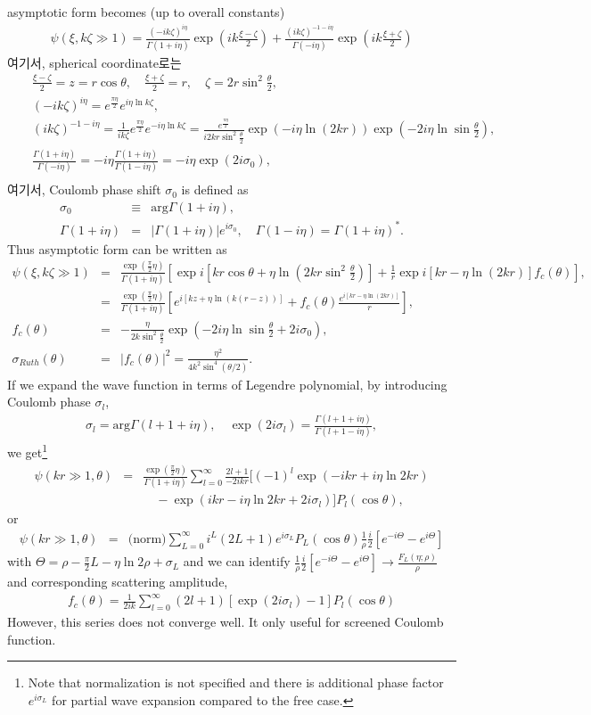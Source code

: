 \documentclass[10pt]{article}
\newcommand{\bea}{\begin{eqnarray}}
\newcommand{\eea}{\end{eqnarray}}
\newcommand{\no}{\nonumber \\}
\begin{document}
 asymptotic form becomes (up to overall constants)
\bea
\psi(\xi,k\zeta\gg 1)=\frac{(-ik\zeta)^{i\eta}}{\Gamma(1+i\eta)}
\exp(ik\frac{\xi-\zeta}{2})+\frac{(ik\zeta)^{-1-i\eta}}{\Gamma(-i\eta)}
\exp(ik\frac{\xi+\zeta}{2})
\eea
여기서, spherical coordinate로는  
\bea
& &\frac{\xi-\zeta}{2}=z=r\cos\theta,\quad \frac{\xi+\zeta}{2}=r,
\quad \zeta=2 r \sin^2\frac{\theta}{2},\no
& &(-ik\zeta)^{i\eta}=e^{\frac{\pi\eta}{2}} e^{i\eta \ln k\zeta},
\no
& &(ik\zeta)^{-1-i\eta}=
   \frac{1}{ik\zeta} e^{\frac{\pi\eta}{2}}e^{-i\eta \ln k\zeta}
  =\frac{e^{\frac{\pi\eta}{2}}}{i2kr\sin^2\frac{\theta}{2}}
   \exp(-i\eta \ln (2kr))\exp(-2i\eta\ln \sin\frac{\theta}{2}) ,\no 
& &\frac{\Gamma(1+i\eta)}{\Gamma(-i\eta)}
   =-i\eta\frac{\Gamma(1+i\eta)}{\Gamma(1-i\eta)}
   =-i\eta \exp(2i\sigma_0),\no   
\eea
여기서, Coulomb phase shift $\sigma_0$ is defined as
\bea
\sigma_0&\equiv&\mbox{arg} \Gamma(1+i\eta),\no
\Gamma(1+i\eta)&=&|\Gamma(1+i\eta)| e^{i\sigma_0},
\quad \Gamma(1-i\eta)=\Gamma(1+i\eta)^*.
\eea
Thus asymptotic form can be written as
\bea
\psi(\xi,k\zeta\gg 1)&=&
 \frac{\exp(\frac{\pi}{2}\eta)}{\Gamma(1+i\eta)}
 \left[ \exp i[kr\cos\theta+\eta\ln (2kr\sin^2\frac{\theta}{2})]
       +\frac{1}{r}\exp i[kr-\eta\ln(2kr)] f_c(\theta)     
 \right],\no
 &=&\frac{\exp(\frac{\pi}{2}\eta)}{\Gamma(1+i\eta)}
  \left[ e^{ i[kz +\eta\ln (k(r-z))]}
        +f_c(\theta)\frac{e^{i[kr-\eta\ln(2kr)]} }{r} 
  \right],\no 
f_c(\theta)&=& -\frac{\eta}{2k \sin^2\frac{\theta}{2}}
              \exp(-2i\eta \ln\sin\frac{\theta}{2}+2i\sigma_0),\no  
\sigma_{Ruth}(\theta)&=&|f_c(\theta)|^2
       =\frac{\eta^2}{4 k^2\sin^4(\theta/2)}.
\eea
If we expand the wave function in terms of Legendre polynomial,
by introducing Coulomb phase $\sigma_l$,
\bea
\sigma_l=\mbox{arg}\Gamma(l+1+i\eta),
\quad \exp(2i\sigma_l)=\frac{\Gamma(l+1+i\eta)}{\Gamma(l+1-i\eta)},
\eea
we get\footnote{ Note that normalization is not specified and 
 there is additional phase factor $e^{i\sigma_L}$ for partial wave expansion
 compared to the free case.
}
\bea
\psi(kr\gg 1,\theta)
&=&\frac{\exp(\frac{\pi}{2}\eta)}{\Gamma(1+i\eta)}
  \sum_{l=0}^\infty \frac{2l+1}{-2ikr}
  \Big[(-1)^l \exp(-ikr+i\eta\ln 2kr) \no & &\quad
  -\exp(ikr-i\eta\ln 2kr+2i\sigma_l)\Big] P_l(\cos\theta),
\eea 
or
\bea  
\psi(kr\gg 1,\theta)&=&\mbox{(norm)}
   \sum_{L=0}^\infty i^L (2L+1)e^{i\sigma_L}  P_L(\cos\theta)
   \frac{1}{\rho}\frac{i}{2}[e^{-i\Theta}-e^{i\Theta}] 
\eea
with $\Theta=\rho-\frac{\pi}{2}L-\eta\ln 2\rho +\sigma_L$
and we can identify 
$\frac{1}{\rho}\frac{i}{2}[e^{-i\Theta}-e^{i\Theta}] 
 \to \frac{F_L(\eta;\rho)}{\rho}$ 
and corresponding scattering amplitude,
\bea
f_c(\theta)
=\frac{1}{2ik}\sum_{l=0}^\infty (2l+1)
 [\exp(2i\sigma_l)-1]P_l(\cos\theta)
\eea
However, this series does not converge well. It only useful for screened Coulomb function. 
\end{document}
